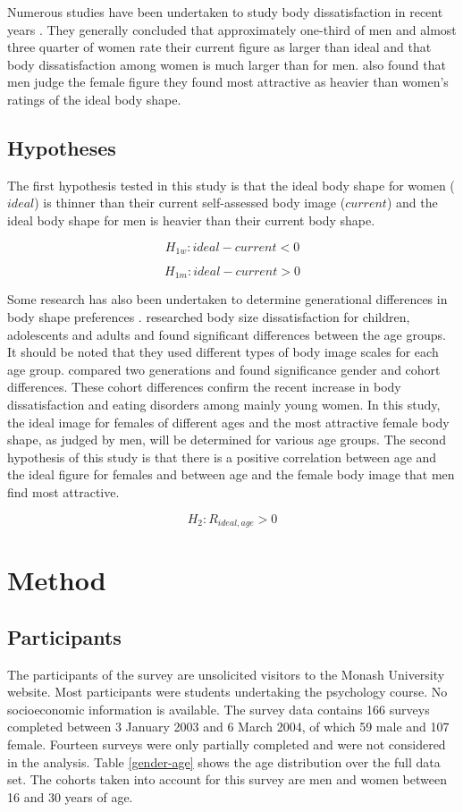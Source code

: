 \documentclass[a4paper, jou]{apa6}
\begin{document}
Numerous studies have been undertaken to study body dissatisfaction in recent years \cite{fallon_sex_1985,tiggeman_development_1990,tiggeman_body-size_1992,lamb_body_1993,abel_relationship_1996,byrne_should_1996,fear_prevalence_1996,cash_how_2004}. They generally concluded that approximately one-third of men and almost three quarter of women rate their current figure as larger than ideal and that body dissatisfaction among women is much larger than for men.  also found that men judge the female figure they found most attractive as heavier than women's ratings of the ideal body shape.
\subsection{Hypotheses}
\label{sec:org7407dd4}
The first hypothesis tested in this study is that the ideal body shape for women (\(ideal\)) is thinner than their current self-assessed body image (\(current\)) and the ideal body shape for men is heavier than their current body shape.

$$H_{1w}: ideal - current < 0 $$

$$H_{1m}: ideal - current > 0 $$

Some research has also been undertaken to determine generational differences in body shape preferences \cite{lamb_body_1993}.  researched body size dissatisfaction for children, adolescents and adults and found significant differences between the age groups. It should be noted that they used different types of body image scales for each age group.  compared two generations and found significance gender and cohort differences. These cohort differences confirm the recent increase in body dissatisfaction and eating disorders among mainly young women. In this study, the ideal image for females of different ages and the most attractive female body shape, as judged by men, will be determined for various age groups. The second hypothesis of this study is that there is a positive correlation between age and the ideal figure for females and between age and the female body image that men find most attractive.

$$H_2: R_{ideal,age} >0$$
\section{Method}
\label{sec:orge615b98}
\subsection{Participants}
\label{sec:org0447363}
The participants of the survey are unsolicited visitors to the Monash University website. Most participants were students undertaking the psychology course. No socioeconomic information is available. The survey data contains 166 surveys completed between 3 January 2003 and 6 March 2004, of which 59 male and 107 female. Fourteen surveys were only partially completed and were not considered in the analysis. Table \ref{gender-age} shows the age distribution over the full data set. The cohorts taken into account for this survey are men and women between 16 and 30 years of age. 
\end{document}
